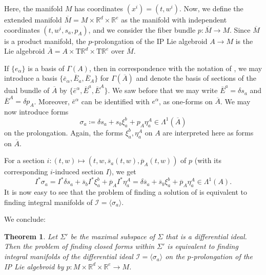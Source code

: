 \documentclass[11pt]{article}
\theoremstyle{plain}
\newtheorem{theorem}{Theorem}
\theoremstyle{definition}
\begin{document}
Here, the manifold $M$ has coordinates $(x^i)=(t,w^i)$. Now, we define the extended manifold $\overline{M}=M\times \mathbb{R}^d\times \mathbb{R}^e$ as the manifold with independent coordinates $(t,w^i,s_a,p_A)$, and we consider the fiber bundle $p\colon \overline M \to M$. Since $\overline M$ is a product manifold, the $p$-prolongation of the IP Lie algebroid $A\to M$ is the Lie algebroid $\overline{A}=A\times \mathrm{T}\mathbb{R}^d\times \mathrm{T}\mathbb{R}^e$ over $\overline{M}$.

If $\{e_\alpha\}$ is a basis of $\Gamma(A)$, then in correspondence with the notation of , we may introduce a basis $\{{\bar e}_\alpha, {\overline E}_a, {\overline E}_A\}$ for $\Gamma(\overline A)$ and denote the basis of sections of the dual bundle of $\overline{A}$ by $\{{\bar e}^\alpha, {\overline E}^a, {\overline E}^A\}$. We saw before that we may write ${\overline E}^a = \delta s_a$ and ${\overline E}^A = \delta p_A$. Moreover, $\bar{e}^{\alpha}$ can be identified with $e^\alpha$, as one-forms on $\overline A$. We may now introduce forms
\begin{equation*}
    \sigma_a\coloneqq \delta s_a+s_b \xi_a^b+p_A \eta_a^A\in \Lambda^1(\overline{A})
\end{equation*}
on the prolongation. Again, the forms $\xi_a^b, \eta_a^A$ on $A$ are interpreted here as forms on $\overline A$.

For a section $i\colon (t,w)\mapsto (t,w, {\overline s}_a(t,w), {\overline p}_A(t,w))$ of $p$ (with its corresponding $i$-induced section $I$), we get
\begin{equation*}
    I^*\sigma_a = I^*\delta s_a+{\overline s}_b I^*\xi_a^b+{\overline p}_A I^*\eta_a^A =   \delta {\overline s}_a+{\overline s}_b \xi_a^b+{\overline p}_A \eta_a^A  \in \Lambda^1(A).
\end{equation*}
It is now easy to see that the problem of finding a solution of  is equivalent to finding integral manifolds of $\mathcal{I}=\langle \sigma_a\rangle$. 


We conclude:
\begin{theorem} \label{prop:new}
Let $\Sigma'$ be the maximal subspace of $\Sigma$ that is a differential ideal. Then the problem of finding closed forms within $\Sigma'$ is equivalent to finding integral manifolds of the differential ideal $\mathcal{I}=\langle \sigma_a\rangle$  on the $p$-prolongation of the IP Lie algebroid by $p\colon M\times \mathbb{R}^d\times \mathbb{R}^e\to M$. 
\end{theorem}
\end{document}

